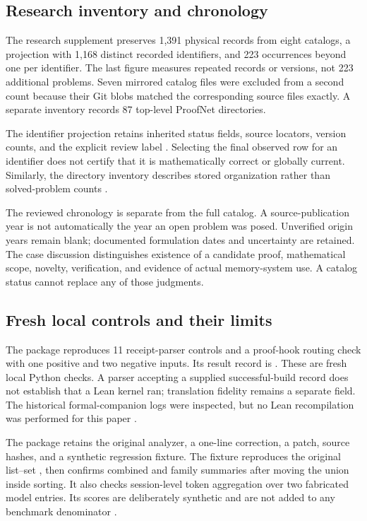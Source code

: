 \subsection{Research inventory and chronology}

The research supplement preserves 1,391 physical records from eight catalogs, a projection with 1,168 distinct recorded identifiers, and 223 occurrences beyond one per identifier. The last figure measures repeated records or versions, not 223 additional problems. Seven mirrored catalog files were excluded from a second count because their Git blobs matched the corresponding source files exactly. A separate inventory records 87 top-level ProofNet directories.

The identifier projection retains inherited status fields, source locators, version counts, and the explicit review label . Selecting the final observed row for an identifier does not certify that it is mathematically correct or globally current. Similarly, the directory inventory describes stored organization rather than solved-problem counts \citep{CaseCampaignIndex2026,CaseProofnetManifest2026}.

The reviewed chronology is separate from the full catalog. A source-publication year is not automatically the year an open problem was posed. Unverified origin years remain blank; documented formulation dates and uncertainty are retained. The case discussion distinguishes existence of a candidate proof, mathematical scope, novelty, verification, and evidence of actual memory-system use. A catalog status cannot replace any of those judgments.

\subsection{Fresh local controls and their limits}

The  package reproduces 11 receipt-parser controls and a proof-hook routing check with one positive and two negative inputs. Its result record is . These are fresh local Python checks. A parser accepting a supplied successful-build record does not establish that a Lean kernel ran; translation fidelity remains a separate field. The historical formal-companion logs were inspected, but no Lean recompilation was performed for this paper \citep{leanarchitecture,freelean,arclean,degreelean}.

The  package retains the original analyzer, a one-line correction, a patch, source hashes, and a synthetic regression fixture. The fixture reproduces the original list--set , then confirms combined and family summaries after moving the union inside sorting. It also checks session-level token aggregation over two fabricated model entries. Its scores are deliberately synthetic and are not added to any benchmark denominator \citep{ab30analyze}.

